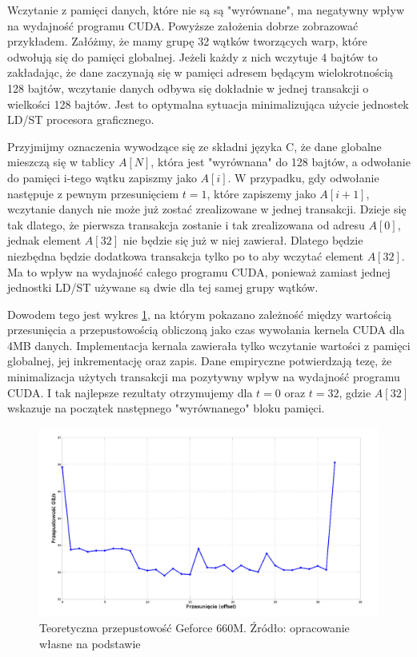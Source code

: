 Wczytanie z pamięci danych, które nie są są "wyrównane", ma negatywny wpływ na
wydajność programu CUDA.  Powyższe założenia dobrze zobrazować przykładem.
Załóżmy, że mamy grupę 32 wątków tworzących warp, które odwołują się do pamięci
globalnej. Jeżeli każdy z nich wczytuje 4 bajtów to zakładając, że dane
zaczynają się w pamięci adresem będącym wielokrotnością 128 bajtów, wczytanie
danych odbywa się dokładnie w jednej transakcji o wielkości 128 bajtów. Jest to
optymalna sytuacja minimalizująca użycie jednostek LD/ST procesora graficznego.

Przyjmijmy oznaczenia wywodzące się ze składni języka C, że dane globalne mieszczą się w
tablicy $A[N]$, która jest "wyrównana" do 128 bajtów, a odwołanie do
pamięci i-tego wątku zapiszmy jako $A[i]$. W przypadku, gdy odwołanie następuje
z pewnym przesunięciem $t = 1$, które zapiszemy jako $A[i + 1]$, wczytanie danych
nie może już zostać zrealizowane w jednej transakcji. Dzieje się tak dlatego, że
pierwsza transakcja zostanie i tak zrealizowana od adresu $A[0]$, jednak element
$A[32]$ nie będzie się już w niej zawierał. Dlatego będzie niezbędna będzie
dodatkowa transakcja tylko po to aby wczytać element $A[32]$. Ma to wpływ na
wydajność całego programu CUDA, ponieważ zamiast jednej jednostki LD/ST używane
są dwie dla tej samej grupy wątków. 

Dowodem tego jest wykres \ref{hier2}, na którym pokazano
zależność między wartością przesunięcia a przepustowością obliczoną jako czas
wywołania kernela CUDA dla 4MB danych. Implementacja kernala zawierała tylko
wczytanie wartości z pamięci globalnej, jej inkrementację oraz zapis.
Dane empiryczne potwierdzają tezę, że minimalizacja użytych transakcji ma
pozytywny wpływ na wydajność programu CUDA. I tak najlepsze rezultaty
otrzymujemy dla $t = 0$ oraz $t = 32$, gdzie $A[32]$ wskazuje na początek 
następnego "wyrównanego" bloku pamięci.

\begin{figure}[H]
\centering
\includegraphics[scale=0.4]{images/gf660_offset.png}
\caption{Teoretyczna przepustowość Geforce 660M. Źródło: opracowanie własne na
	podstawie \cite{memperf}}
\label{hier2}
\end{figure}


